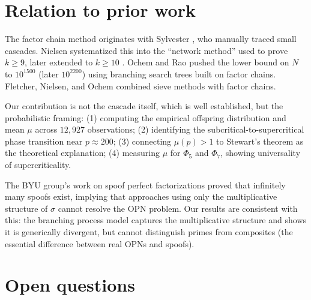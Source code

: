 \documentclass[11pt]{article}
\theoremstyle{definition}
\theoremstyle{remark}
\newcommand{\Phi}{\varPhi}
\begin{document}
\section{Relation to prior work}

The factor chain method originates with Sylvester \cite{Sylvester1888}, who manually traced small cascades. Nielsen \cite{Nielsen2007} systematized this into the ``network method'' used to prove $k \geq 9$, later extended to $k \geq 10$ \cite{Nielsen2015}. Ochem and Rao \cite{OchemRao2012} pushed the lower bound on $N$ to $10^{1500}$ (later $10^{2200}$) using branching search trees built on factor chains. Fletcher, Nielsen, and Ochem \cite{FletcherNielsenOchem} combined sieve methods with factor chains.

Our contribution is not the cascade itself, which is well established, but the probabilistic framing: (1) computing the empirical offspring distribution and mean $\mu$ across $12{,}927$ observations; (2) identifying the subcritical-to-supercritical phase transition near $p \approx 200$; (3) connecting $\mu(p) > 1$ to Stewart's theorem as the theoretical explanation; (4) measuring $\mu$ for $\Phi_5$ and $\Phi_7$, showing universality of supercriticality.

The BYU group's work on spoof perfect factorizations \cite{NielsenSpoofs} proved that infinitely many spoofs exist, implying that approaches using only the multiplicative structure of $\sigma$ cannot resolve the OPN problem. Our results are consistent with this: the branching process model captures the multiplicative structure and shows it is generically divergent, but cannot distinguish primes from composites (the essential difference between real OPNs and spoofs).

\section{Open questions}
\end{document}

